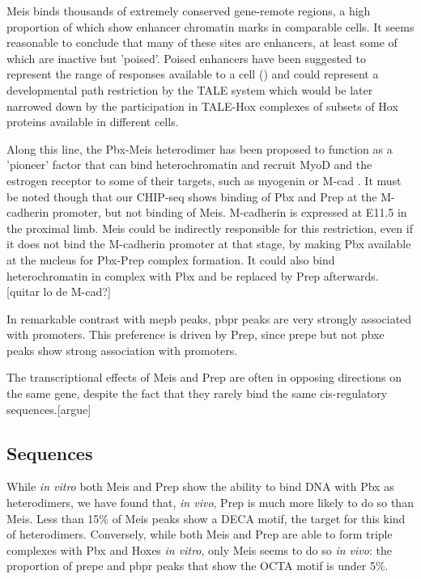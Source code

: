 Meis binds thousands of extremely conserved gene-remote regions, a high proportion of which show enhancer chromatin marks in comparable cells. It seems reasonable to conclude that many of these sites are enhancers, at least some of which are inactive but 'poised'. Poised enhancers have been suggested to represent the range of responses available to a cell (\cite{Creyghton2010}) and could represent a developmental path restriction by the \ac{TALE} system which would be later narrowed down by the participation in \ac{TALE}-Hox complexes of subsets of Hox proteins available in different cells. 

Along this line, the Pbx-Meis heterodimer has been proposed to function as a 'pioneer' factor that can bind heterochromatin and recruit MyoD and the estrogen receptor to some of their targets, such as myogenin or M-cad \parencite{Berkes2004, Magnani2011}. It must be noted though that our \ac{CHIP}-seq shows binding of Pbx and Prep at the M-cadherin promoter, but not binding of Meis. M-cadherin is expressed at E11.5 in the proximal limb. Meis could be indirectly responsible for this restriction, even if it does not bind the M-cadherin promoter at that stage, by making Pbx available at the nucleus for Pbx-Prep complex formation. It could also bind heterochromatin in complex with Pbx and be replaced by Prep afterwards.  [quitar lo de M-cad?]


In remarkable contrast with \ac{mepb} peaks, \ac{pbpr} peaks are very strongly associated with promoters. This preference is driven by Prep, since \ac{prepe} but not \ac{pbxe} peaks show strong association with promoters.  

The transcriptional effects of Meis and Prep are often in opposing directions on the same gene, despite the fact that they rarely bind the same cis-regulatory sequences.[argue]

\subsection{Sequences}

While \textit{in vitro} both Meis and Prep show the ability to bind DNA with Pbx as heterodimers, we have found that, \textit{in vivo}, Prep is much more likely to do so than Meis. Less than 15\% of Meis peaks show a \ac{DECA} motif, the target for this kind of heterodimers. Conversely, while both Meis and Prep are able to form triple complexes with Pbx and Hoxes \textit{in vitro}, only Meis seems to do so \textit{in vivo}: the proportion of \ac{prepe} and \ac{pbpr} peaks that show the \ac{OCTA} motif is under 5\%. 

